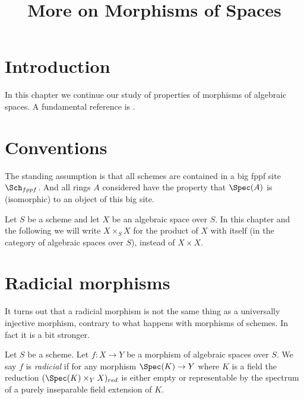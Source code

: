 

%


\title{More on Morphisms of Spaces}


\maketitle

\label{section-phantom}

\tableofcontents

\section{Introduction}
\label{section-introduction}

\noindent
In this chapter we continue our study of properties of morphisms of algebraic
spaces. A fundamental reference is \cite{Kn}.





\section{Conventions}
\label{section-conventions}

\noindent
The standing assumption is that all schemes are contained in
a big fppf site $\Sch_{fppf}$. And all rings $A$ considered
have the property that $\Spec(A)$ is (isomorphic) to an
object of this big site.

\medskip\noindent
Let $S$ be a scheme and let $X$ be an algebraic space over $S$.
In this chapter and the following we will write $X \times_S X$
for the product of $X$ with itself (in the category of algebraic
spaces over $S$), instead of $X \times X$.








\section{Radicial morphisms}
\label{section-radicial}

\noindent
It turns out that a radicial morphism is not the same thing as a
universally injective morphism, contrary to what happens with
morphisms of schemes. In fact it is a bit stronger.

\begin{definition}
\label{definition-radicial}
Let $S$ be a scheme. Let $f : X \to Y$ be a morphism of algebraic spaces
over $S$. We say $f$ is {\it radicial} if for any morphism
$\Spec(K) \to Y$ where $K$ is a field the reduction
$(\Spec(K) \times_Y X)_{red}$ is either empty or
representable by the spectrum of a purely inseparable field extension of $K$.
\end{definition}

